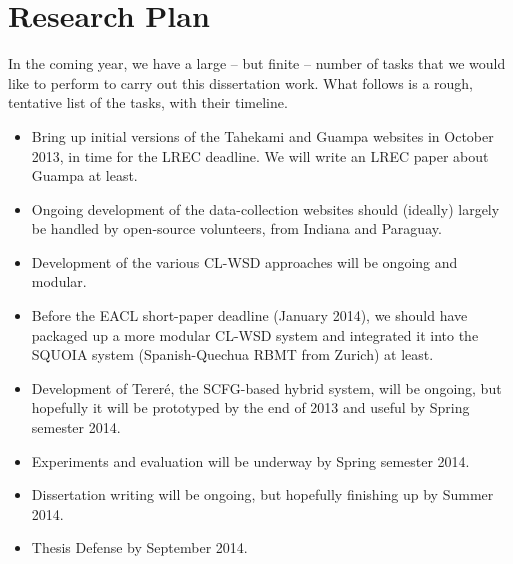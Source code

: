 \section{Research Plan}

In the coming year, we have a large -- but finite -- number of tasks that we
would like to perform to carry out this dissertation work. What follows is a
rough, tentative list of the tasks, with their timeline.

\begin{itemize}
  \item Bring up initial versions of the Tahekami and Guampa websites in
  October 2013, in time for the LREC deadline. We will write an LREC paper
  about Guampa at least.
  \item Ongoing development of the data-collection websites should (ideally)
  largely be handled by open-source volunteers, from Indiana and Paraguay.
  \item Development of the various CL-WSD approaches will be ongoing and
  modular.
  \item Before the EACL short-paper deadline (January 2014), we should have
  packaged up a more modular CL-WSD system and integrated it into the SQUOIA
  system (Spanish-Quechua RBMT from Zurich) at least.
  \item Development of Tereré, the SCFG-based hybrid system, will be ongoing,
  but hopefully it will be prototyped by the end of 2013 and useful by Spring
  semester 2014.
  \item Experiments and evaluation will be underway by Spring semester 2014.
  \item Dissertation writing will be ongoing, but hopefully finishing up by
  Summer 2014.
  \item Thesis Defense by September 2014.
\end{itemize}
